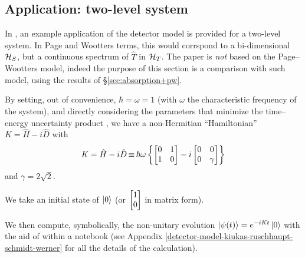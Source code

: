 

\subsection{Application: two-level system}

In \cite{RuschhauptAbsorption}, an example application of the detector model
is provided for a two-level system.
In Page and Wootters terms,
this would corrspond to a bi-dimensional $\mathcal{H}_S$, but a continuous
spectrum of $\hat{T}$ in $\mathcal{H}_T$. The paper is \emph{not} based on
the Page--Wootters model, indeed the purpose of this section is a comparison
with such model, using the results of \S \ref{sec:absorption+pw}.

By setting, out of convenience, $\hbar = \omega = 1$
(with $\omega$ the characteristic frequency of the system),
and directly considering the parameters
that minimize the time--energy uncertainty product \parencite{RuschhauptAbsorption},
we have a non-Hermitian ``Hamiltonian''
$\mathit{K} = \hat{H} - i\hat{D}$ with
\begin{equation}\label{eq:complexpot}
  \mathit{K} = \hat{H} - i\hat{D} \operatorname*{\equiv}
    \hbar\omega\left\{
      \left[\begin{matrix}0 & 1\\1 & 0\end{matrix}\right] -
      i \left[\begin{matrix}0 & 0\\0 & \gamma \end{matrix}\right]
    \right\}
\end{equation}
and $\gamma = 2\sqrt{2}$.

We take an initial state of $\ket{0}$
(or $\mqty[1\\0]$ in matrix form).

We then compute, symbolically, the non-unitary evolution
$\ket{\psi(t)} = e^{-i\mathit{K}t}\ket{0}$
with the aid of  \parencite{comp:sympy} within a  \parencite{comp:jupyter} notebook
(see Appendix \ref{detector-model-kiukas-ruschhaupt-schmidt-werner} for all the details of the calculation).

